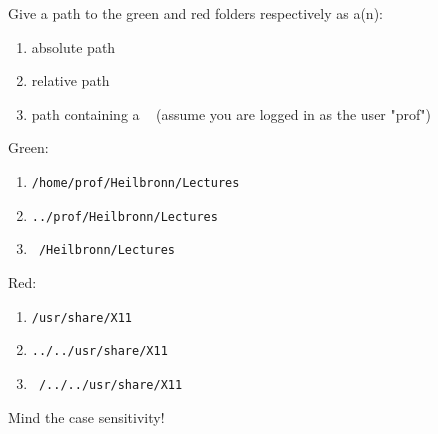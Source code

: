 \documentclass[english]{sheet}
\newcommand{\myline}[3][TUMBlack]{
    \path(#2.south) --(#3.north)  coordinate[pos=0.4](mid);
    \ifthenelse{\equal{#1}{black}}
    {\draw[-latex, draw=#1] (#2.south) |- (mid) -| (#3.north);}
    {\draw[-latex, draw=#1, very thick] (#2.south) |- (mid) -| (#3.north);}
}
\begin{document}
\begin{exercise}[subtitle=Filesystem Paths]
\begin{center}
    \end{center}

    \bigskip

    Give a path to the green and red folders respectively as a(n):
    \begin{enumerate}
        \item absolute path
        \item relative path
        \item path containing a \texttt{~} (assume you are logged in as the user "prof")
    \end{enumerate}
\end{exercise}

\begin{solution}
    Green:
    \begin{enumerate}
        \item \texttt{/home/prof/Heilbronn/Lectures}
        \item \texttt{../prof/Heilbronn/Lectures}
        \item \texttt{~/Heilbronn/Lectures}
    \end{enumerate}
    Red:
    \begin{enumerate}
        \item \texttt{/usr/share/X11}
        \item \texttt{../../usr/share/X11}
        \item \texttt{~/../../usr/share/X11}
    \end{enumerate}
    Mind the case sensitivity!
\end{solution}
\end{document}
